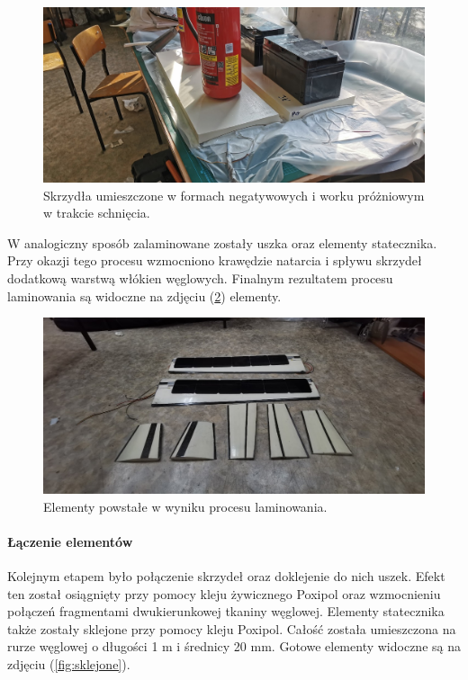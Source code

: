\documentclass[12pt, a4paper]{article}
\let\oldref\ref
\renewcommand{\ref}[1]{(\oldref{#1})}
\begin{document}
 \begin{figure}[ht]
    \centering
    \includegraphics[width=1\textwidth]{budowa9}
    \caption{Skrzydła umieszczone w formach negatywowych i worku próżniowym w trakcie schnięcia.}
    \label{fig:schniecie}
\end{figure}

W analogiczny sposób zalaminowane zostały uszka oraz elementy statecznika. Przy okazji tego procesu wzmocniono krawędzie natarcia i spływu skrzydeł dodatkową warstwą włókien węglowych. Finalnym rezultatem procesu laminowania są widoczne na zdjęciu \ref{fig:kompozytki} elementy.

 \begin{figure}[ht]
    \centering
    \includegraphics[width=1\textwidth]{budowa11}
    \caption{Elementy powstałe w wyniku procesu laminowania.}
    \label{fig:kompozytki}
\end{figure}

\FloatBarrier
\paragraph{Łączenie elementów}\mbox{}

Kolejnym etapem było połączenie skrzydeł oraz doklejenie do nich uszek. Efekt ten został osiągnięty przy pomocy kleju żywicznego Poxipol oraz wzmocnieniu połączeń fragmentami dwukierunkowej tkaniny węglowej. Elementy statecznika także zostały sklejone przy pomocy kleju Poxipol. Całość została umieszczona na rurze węglowej o długości 1 m i średnicy 20 mm. Gotowe elementy widoczne są na zdjęciu \ref{fig:sklejone}.
\end{document}
